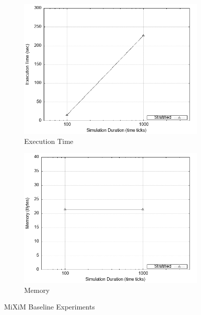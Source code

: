 \documentclass[logo,msc,cyber]{infthesis}   %
\begin{document}
\begin{figure}[h!]
    \hfill
    \begin{subfigure}[b]{0.45\textwidth}
        \centering
        \includegraphics[width=\textwidth]{figures/baseline_simulation/mixim/baseline_mixim_time.png}
        \caption{Execution Time}
        \label{fig:baseline-mixim-time}
    \end{subfigure}
    \hfill
    \begin{subfigure}[b]{0.45\textwidth}
        \centering
        \includegraphics[width=\textwidth]{figures/baseline_simulation/mixim/baseline_mixim_mem.png}
        \caption{Memory}
        \label{fig:baseline-mixim-mem}
    \end{subfigure}
       \caption{MiXiM Baseline Experiments}
       \label{fig:baseline-mixim-simulation}
 \end{figure}
\end{document}
